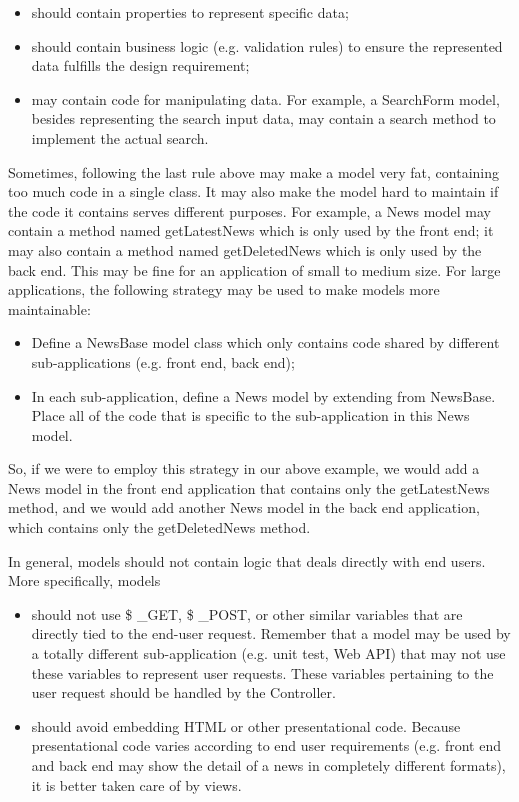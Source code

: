 \begin{itemize}
\item should contain properties to represent specific data;
\item should contain business logic (e.g. validation rules) to ensure the represented data fulfills the design requirement;
\item may contain code for manipulating data. For example, a SearchForm model, besides representing the search input data, may contain a search method to implement the actual search.
\end{itemize}

Sometimes, following the last rule above may make a model very fat, containing too much code in a single class. It may also make the model hard to maintain if the code it contains serves different purposes. For example, a News model may contain a method named getLatestNews which is only used by the front end; it may also contain a method named getDeletedNews which is only used by the back end. This may be fine for an application of small to medium size. For large applications, the following strategy may be used to make models more maintainable:

\begin{itemize}
\item Define a NewsBase model class which only contains code shared by different sub-applications (e.g. front end, back end);
\item In each sub-application, define a News model by extending from NewsBase. Place all of the code that is specific to the sub-application in this News model.
\end{itemize}

So, if we were to employ this strategy in our above example, we would add a News model in the front end application that contains only the getLatestNews method, and we would add another News model in the back end application, which contains only the getDeletedNews method.

In general, models should not contain logic that deals directly with end users. More specifically, models

\begin{itemize}
\item should not use \$ \_GET, \$ \_POST, or other similar variables that are directly tied to the end-user request. Remember that a model may be used by a totally different sub-application (e.g. unit test, Web API) that may not use these variables to represent user requests. These variables pertaining to the user request should be handled by the Controller.
\item should avoid embedding HTML or other presentational code. Because presentational code varies according to end user requirements (e.g. front end and back end may show the detail of a news in completely different formats), it is better taken care of by views.
\end{itemize}
